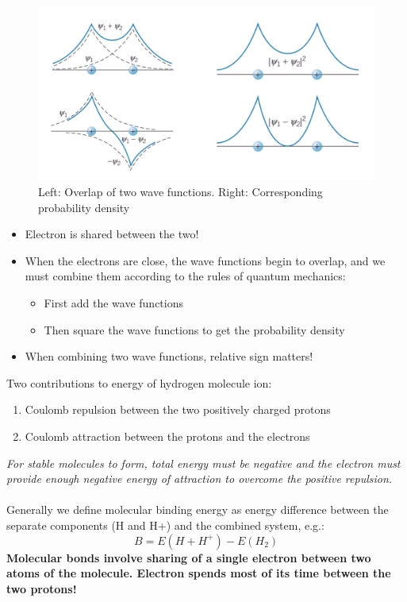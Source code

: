 \documentclass[class=article,crop=false]{standalone}
\begin{document}
\begin{figure}[h!]
	\centering
	\includegraphics[width=.9\linewidth]{./Images/hydrogen_wave_functions.png}
	\caption{Left: Overlap of two wave functions. Right: Corresponding probability density}
\end{figure}

\begin{itemize}
	\item Electron is shared between the two!
	\item When the electrons are close, the wave functions begin to overlap, and we must combine them according to the rules of quantum mechanics:
		\begin{itemize}
			\item First add the wave functions
			\item Then square the wave functions to get the probability density
		\end{itemize}
	\item When combining two wave functions, relative sign matters!
\end{itemize}

Two contributions to energy of hydrogen molecule ion:

\begin{enumerate}
	\item Coulomb repulsion between the two positively charged protons
	\item Coulomb attraction between the protons and the electrons
\end{enumerate}

\emph{For stable molecules to form, total energy must be negative and the electron must provide enough negative energy of attraction to overcome the positive repulsion.}\\
\\

Generally we define molecular binding energy as energy difference between the separate components (H and H+) and the combined system, e.g.:
$$ B = E(H + H^+) - E(H_2) $$
\textbf{Molecular bonds involve sharing of a single electron between two atoms of the molecule. Electron spends most of its time between the two protons!}
\end{document}
